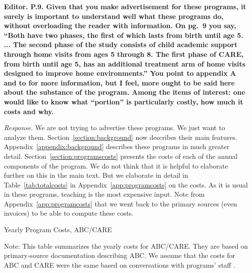 \noindent \textbf{Editor. P.9. Given that you make advertisement for these programs, it surely is important to understand well what these programs do, without overloading the reader with information. On pg.\ 9 you say, ``Both have two phases, the first of which lasts from birth until age 5. ... The second phase of the study consists of child academic support through home visits from ages 5 through 8. The first phase of CARE, from birth until age 5, has an additional treatment arm of home visits designed to improve home environments.'' You point to appendix A and to \citet{Garcia_Heckman_Ziff_2017_Gender-Diff_UNPUBLISHED} for more information, but I feel, more ought to be said here about the substance of the program. Among the items of interest: one would like to know what ``portion'' is particularly costly, how much it costs and why.}

\noindent \textit{Response.} We are not trying to advertise these programs. We just want to analyze them. Section~\ref{section:background} now describes their main features. Appendix~\ref{appendix:background} describes these programs in much greater detail. Section~\ref{section:programscosts} presents the costs of each of the annual components of the program. We do not think that it is helpful to elaborate further on this in the main text. But we elaborate in detail in Table~\ref{tab:totalcosts} in Appendix~\ref{app:programcosts} on the costs. As it is usual in these programs, teaching is the most expensive input. Note from Appendix~\ref{app:programcosts} that we went back to the primary sources (even invoices) to be able to compute these costs.

\begin{table}[H]
\centering
\begin{threeparttable}
\caption{Yearly Program Costs, ABC/CARE}
\footnotesize

\begin{tablenotes}
\footnotesize
\item Note: This table summarizes the yearly costs for ABC/CARE. They are based on primary-source documentation describing ABC. We assume that the costs for ABC and CARE were the same based on conversations with programs' staff \citep{projectcare2014interviews,abc2014-2015interviews}.
\end{tablenotes}
\end{threeparttable}
\end{table}

